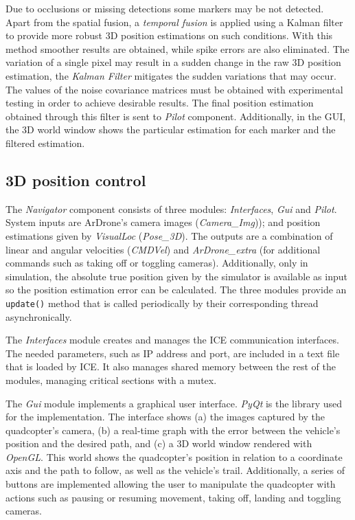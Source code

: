 \documentclass{styles/svproc}
\begin{document}
        Due to occlusions or missing detections some markers may be not detected. Apart from the spatial fusion, a \textit{temporal fusion} is applied using a Kalman filter to provide more robust 3D position estimations on such conditions. With this method smoother results are obtained, while spike errors are also eliminated. The variation of a single pixel may result in a sudden change in the raw 3D position estimation, the \textit{Kalman Filter} mitigates the sudden variations that may occur. The values of the noise covariance matrices must be obtained with experimental testing in order to achieve desirable results. The final position estimation obtained through this filter is sent to \textit{Pilot} component. Additionally, in the GUI, the 3D world window shows the particular estimation for each marker and the filtered estimation.
	
\subsection{3D position control}


The \textit{Navigator} component consists of three modules: \textit{Interfaces}, \textit{Gui} and \textit{Pilot}. System inputs are ArDrone's camera images (\textit{Camera\_Img})); and position estimations given by \textit{VisualLoc} (\textit{Pose\_3D}). The outputs are a combination of linear and angular velocities (\textit{CMDVel}) and \textit{ArDrone\_extra} (for additional commands such as taking off or toggling cameras). Additionally, only in simulation, the absolute true position given by the simulator is available as input so the position estimation error can be calculated. The three modules provide an \texttt{update()} method that is called periodically by their corresponding thread asynchronically. 
	
	The \textit{Interfaces} module creates and manages the ICE communication interfaces. The needed parameters, such as IP address and port, are included in a text file that is loaded by ICE. It also manages shared memory between the rest of the modules, managing critical sections with a mutex. 

        The \textit{Gui} module implements a graphical user interface. \textit{PyQt} is the library used for the implementation. The interface shows (a) the images captured by the quadcopter's camera, (b) a real-time graph with the error between the vehicle's position and the desired path, and (c) a 3D world window rendered with \textit{OpenGL}. This world shows the quadcopter's position in relation to a coordinate axis and the path to follow, as well as the vehicle's trail. Additionally, a series of buttons are implemented allowing the user to manipulate the quadcopter with actions such as pausing or resuming movement, taking off, landing and toggling cameras.
	
\end{document}
